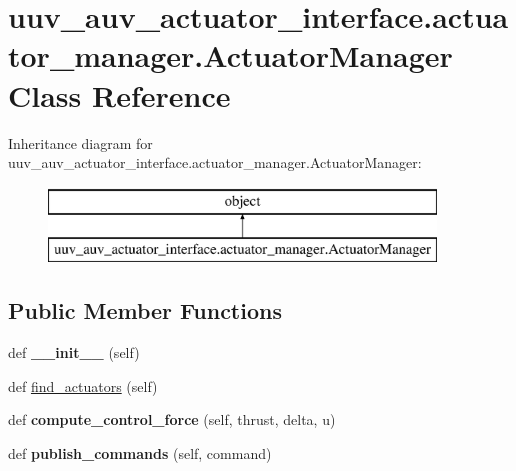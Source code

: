 \hypertarget{classuuv__auv__actuator__interface_1_1actuator__manager_1_1ActuatorManager}{}\section{uuv\+\_\+auv\+\_\+actuator\+\_\+interface.\+actuator\+\_\+manager.\+Actuator\+Manager Class Reference}
\label{classuuv__auv__actuator__interface_1_1actuator__manager_1_1ActuatorManager}
Inheritance diagram for uuv\+\_\+auv\+\_\+actuator\+\_\+interface.\+actuator\+\_\+manager.\+Actuator\+Manager\+:\begin{figure}[H]
\begin{center}
\leavevmode
\includegraphics[height=2.000000cm]{classuuv__auv__actuator__interface_1_1actuator__manager_1_1ActuatorManager}
\end{center}
\end{figure}
\subsection*{Public Member Functions}
\begin{DoxyCompactItemize}
\item 
\mbox{\label{classuuv__auv__actuator__interface_1_1actuator__manager_1_1ActuatorManager_ad6d3d9b99024a1a0f5fdbc6be598f77d}} 
def {\bfseries \+\_\+\+\_\+init\+\_\+\+\_\+} (self)
\item 
def \hyperlink{classuuv__auv__actuator__interface_1_1actuator__manager_1_1ActuatorManager_a1c8c06aa3e9a62acff2b4002f7b02dd2}{find\+\_\+actuators} (self)
\item 
\mbox{\label{classuuv__auv__actuator__interface_1_1actuator__manager_1_1ActuatorManager_a1c55d2294a80e5e86e77271dfd7f957d}} 
def {\bfseries compute\+\_\+control\+\_\+force} (self, thrust, delta, u)
\item 
\mbox{\label{classuuv__auv__actuator__interface_1_1actuator__manager_1_1ActuatorManager_abb2b0265a2173b5ecde7b51124fcf943}} 
def {\bfseries publish\+\_\+commands} (self, command)
\end{DoxyCompactItemize}

